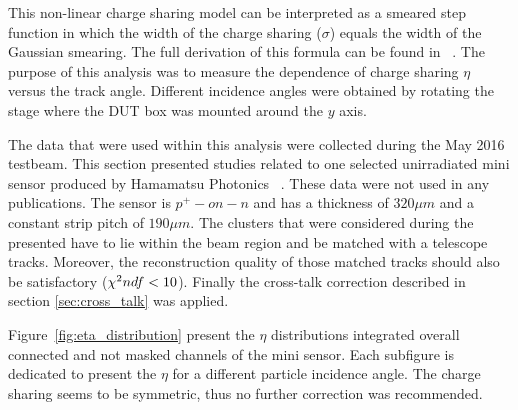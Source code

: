 This non-linear charge sharing model can be interpreted as a smeared step function in which the width of the charge sharing ($ \sigma $) equals the width of the Gaussian smearing.   The full derivation of this formula can be found in ~\cite{eta_note}. 
The purpose of this analysis was to measure the dependence of charge sharing $ \eta $ versus the track angle.  Different incidence angles were obtained by rotating the stage where the DUT box was mounted around the $y$ axis. 

The data that were used within this analysis were collected during the May 2016 testbeam.  This section presented studies related to one selected unirradiated mini sensor produced by Hamamatsu Photonics ~\cite{Hamamatsu}. These data were not used in any publications. The sensor is $p^{+}-on-n$ and has a thickness of $320 \mu m$ and a constant strip pitch of $190 \mu m$. The clusters that were considered during the presented have to lie within the beam region and be matched with a telescope tracks.  Moreover, the reconstruction quality of those matched tracks should also be satisfactory ($\chi^{2}\/ndf<10$).
Finally the cross-talk correction described in section \ref{sec:cross_talk} was applied.

Figure~\ref{fig:eta_distribution} present the $\eta$ distributions integrated overall connected and not masked channels of the mini sensor. Each subfigure is dedicated to present the  $\eta$ for a different particle incidence angle. 
The charge sharing seems to be symmetric, thus no further correction was recommended. 

